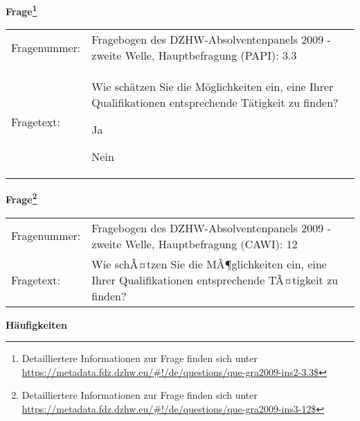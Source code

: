 				\vspace*{0.5cm}
                \noindent\textbf{Frage\footnote{Detailliertere Informationen zur Frage finden sich unter
		              \url{https://metadata.fdz.dzhw.eu/\#!/de/questions/que-gra2009-ins2-3.3$}}}\\
				\begin{tabularx}{\hsize}{@{}lX}
					Fragenummer: &
					  Fragebogen des DZHW-Absolventenpanels 2009 - zweite Welle, Hauptbefragung (PAPI):
					  3.3
 \\
					Fragetext: & Wie schätzen Sie die Möglichkeiten ein, eine Ihrer Qualifikationen entsprechende Tätigkeit zu finden?\par  Ja\par  Nein \\
				\end{tabularx}
				\vspace*{0.5cm}
                \noindent\textbf{Frage\footnote{Detailliertere Informationen zur Frage finden sich unter
		              \url{https://metadata.fdz.dzhw.eu/\#!/de/questions/que-gra2009-ins3-12$}}}\\
				\begin{tabularx}{\hsize}{@{}lX}
					Fragenummer: &
					  Fragebogen des DZHW-Absolventenpanels 2009 - zweite Welle, Hauptbefragung (CAWI):
					  12
 \\
					Fragetext: & Wie schÃ¤tzen Sie die MÃ¶glichkeiten ein, eine Ihrer Qualifikationen entsprechende TÃ¤tigkeit zu finden? \\
				\end{tabularx}





        		\vspace*{0.5cm}
                \noindent\textbf{Häufigkeiten}

